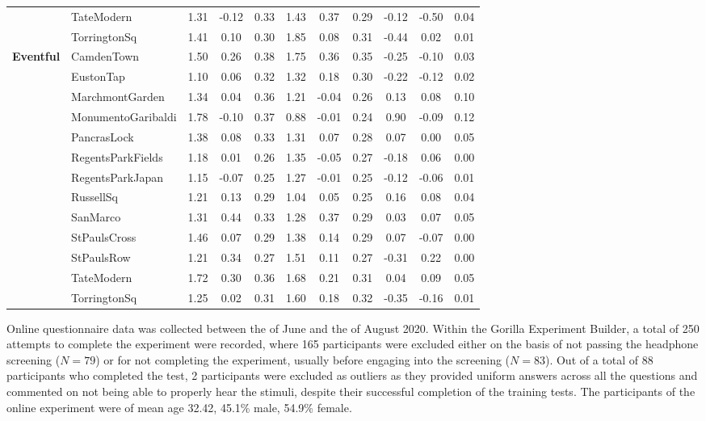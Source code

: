 \begin{table}
\begin{tabular}{cl|ccc|ccc|ccc}
   & TateModern & 1.31 & -0.12 & 0.33 & 1.43 & 0.37 & 0.29 & -0.12 & -0.50 & 0.04 \\
   & TorringtonSq & 1.41 & 0.10 & 0.30 & 1.85 & 0.08 & 0.31 & -0.44 & 0.02 & 0.01 \\ 
  \hline
  \multirow{13}{*}{\textbf{Eventful }} & CamdenTown & 1.50 & 0.26 & 0.38 & 1.75 & 0.36 & 0.35 & -0.25 & -0.10 & 0.03 \\
   & EustonTap & 1.10 & 0.06 & 0.32 & 1.32 & 0.18 & 0.30 & -0.22 & -0.12 & 0.02 \\
   & MarchmontGarden & 1.34 & 0.04 & 0.36 & 1.21 & -0.04 & 0.26 & 0.13 & 0.08 & 0.10 \\
   & MonumentoGaribaldi & 1.78 & -0.10 & 0.37 & 0.88 & -0.01 & 0.24 & 0.90 & -0.09 & 0.12 \\
   & PancrasLock & 1.38 & 0.08 & 0.33 & 1.31 & 0.07 & 0.28 & 0.07 & 0.00 & 0.05 \\
   & RegentsParkFields & 1.18 & 0.01 & 0.26 & 1.35 & -0.05 & 0.27 & -0.18 & 0.06 & 0.00 \\
   & RegentsParkJapan & 1.15 & -0.07 & 0.25 & 1.27 & -0.01 & 0.25 & -0.12 & -0.06 & 0.01 \\
   & RussellSq & 1.21 & 0.13 & 0.29 & 1.04 & 0.05 & 0.25 & 0.16 & 0.08 & 0.04 \\
   & SanMarco & 1.31 & 0.44 & 0.33 & 1.28 & 0.37 & 0.29 & 0.03 & 0.07 & 0.05 \\
   & StPaulsCross & 1.46 & 0.07 & 0.29 & 1.38 & 0.14 & 0.29 & 0.07 & -0.07 & 0.00 \\
   & StPaulsRow & 1.21 & 0.34 & 0.27 & 1.51 & 0.11 & 0.27 & -0.31 & 0.22 & 0.00 \\
   & TateModern & 1.72 & 0.30 & 0.36 & 1.68 & 0.21 & 0.31 & 0.04 & 0.09 & 0.05 \\
   & TorringtonSq & 1.25 & 0.02 & 0.31 & 1.60 & 0.18 & 0.32 & -0.35 & -0.16 & 0.01 \\
  \bottomrule
  \end{tabular}
  \end{table}

   Online questionnaire data was collected between the  of June and the  of August 2020. Within the Gorilla Experiment Builder, a total of 250 attempts to complete the experiment were recorded, where 165 participants were excluded either on the basis of not passing the headphone screening ($N=79$) or for not completing the experiment, usually before engaging into the screening ($N=83$). Out of a total of 88 participants who completed the test, 2 participants were excluded as outliers as they provided uniform answers across all the questions and commented on not being able to properly hear the stimuli, despite their successful completion of the training tests. The participants of the online experiment were of mean age 32.42, 45.1\% male, 54.9\% female.


